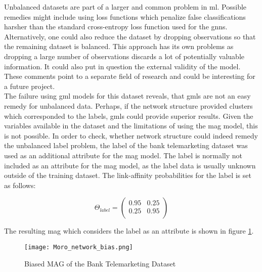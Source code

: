   \noindent Unbalanced datasets are part of a larger and common problem in 
  \acs{ml}. Possible remedies might include using loss functions which 
  penalize false classifications harsher than the standard cross-entropy loss 
  function used for the \acsp{gnn}. Alternatively, one could also reduce the 
  dataset by dropping observations so that the remaining dataset is balanced. 
  This approach has its own problems as dropping a large number of observations 
  discards a lot of potentially valuable information. It could also put in 
  question the external validity of the model. These comments point to a 
  separate field of research and could be interesting for a future project. \\

  \noindent The failure using \acs{gml} models for this dataset reveals, that 
  \acsp{gml} are not an easy remedy for unbalanced data. Perhaps, if the
  network structure provided clusters which corresponded to the labels,
  \acsp{gml} could provide superior results. Given the variables available in 
  the dataset and the limitations of using the \acs{mag} model, this is not 
  possible. In order to check, whether network structure could indeed remedy 
  the unbalanced label problem, the label of the bank telemarketing dataset was 
  used as an additional attribute for the \acs{mag} model. The label is 
  normally not included as an attribute for the \acs{mag} model, as the label 
  data is usually unknown outside of the training dataset. The link-affinity 
  probabilities for the label is set as follows:

  \[ \Theta_{label} = 
	\begin{pmatrix}
        0.95 & 0.25 \\
		0.25 & 0.95 \\
	\end{pmatrix}
	\] 
  
  \noindent The resulting \acs{mag} which considers the label as an attribute 
  is shown in figure \ref{fig:Moro_bias}.

  \begin{figure}[h]
		\centering
		\texttt{[image: Moro\_network\_bias.png]}
		\caption{Biased MAG of the Bank Telemarketing Dataset}
        \label{fig:Moro_bias}
  \end{figure}

